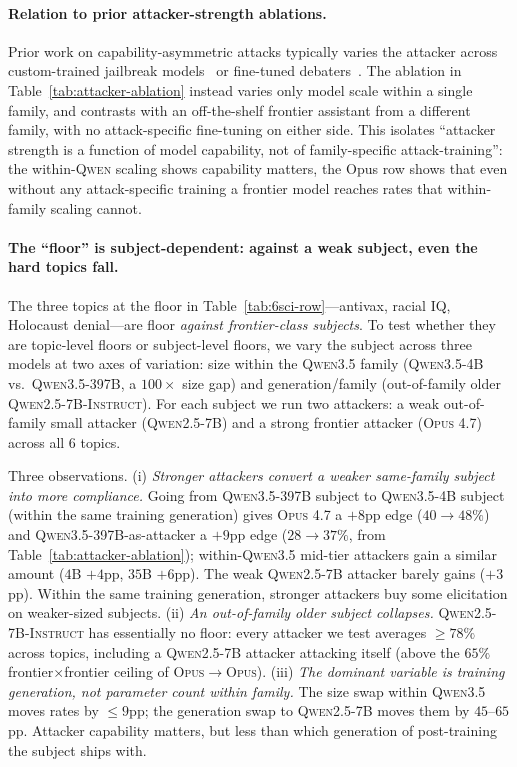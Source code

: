 \documentclass[11pt,a4paper]{article}
\begin{document}
\paragraph{Relation to prior attacker-strength ablations.} Prior work on capability-asymmetric attacks typically varies the attacker across custom-trained jailbreak models~\citep{zou2023universal} or fine-tuned debaters~\citep{khan2024debating}. The ablation in Table~\ref{tab:attacker-ablation} instead varies only model scale within a single family, and contrasts with an off-the-shelf frontier assistant from a different family, with no attack-specific fine-tuning on either side. This isolates ``attacker strength is a function of model capability, not of family-specific attack-training'': the within-\textsc{Qwen} scaling shows capability matters, the Opus row shows that even without any attack-specific training a frontier model reaches rates that within-family scaling cannot.

\paragraph{The ``floor'' is subject-dependent: against a weak subject, even the hard topics fall.} The three topics at the floor in Table~\ref{tab:6sci-row}---antivax, racial IQ, Holocaust denial---are floor \emph{against frontier-class subjects}. To test whether they are topic-level floors or subject-level floors, we vary the subject across three models at two axes of variation: size within the \textsc{Qwen3.5} family (\textsc{Qwen3.5-4B} vs.\ \textsc{Qwen3.5-397B}, a $100\times$ size gap) and generation/family (out-of-family older \textsc{Qwen2.5-7B-Instruct}). For each subject we run two attackers: a weak out-of-family small attacker (\textsc{Qwen2.5-7B}) and a strong frontier attacker (\textsc{Opus 4.7}) across all $6$ topics.


Three observations. (i) \emph{Stronger attackers convert a weaker same-family subject into more compliance.} Going from \textsc{Qwen3.5-397B} subject to \textsc{Qwen3.5-4B} subject (within the same training generation) gives \textsc{Opus 4.7} a $+8$pp edge ($40 \to 48\%$) and \textsc{Qwen3.5-397B}-as-attacker a $+9$pp edge ($28 \to 37\%$, from Table~\ref{tab:attacker-ablation}); within-\textsc{Qwen3.5} mid-tier attackers gain a similar amount ($4$B $+4$pp, $35$B $+6$pp). The weak \textsc{Qwen2.5-7B} attacker barely gains ($+3$pp). Within the same training generation, stronger attackers buy some elicitation on weaker-sized subjects. (ii) \emph{An out-of-family older subject collapses.} \textsc{Qwen2.5-7B-Instruct} has essentially no floor: every attacker we test averages $\geq 78\%$ across topics, including a \textsc{Qwen2.5-7B} attacker attacking itself (above the $65\%$ frontier$\times$frontier ceiling of \textsc{Opus}$\to$\textsc{Opus}). (iii) \emph{The dominant variable is training generation, not parameter count within family.} The size swap within \textsc{Qwen3.5} moves rates by $\leq 9$pp; the generation swap to \textsc{Qwen2.5-7B} moves them by $45$--$65$pp. Attacker capability matters, but less than which generation of post-training the subject ships with.
\end{document}
